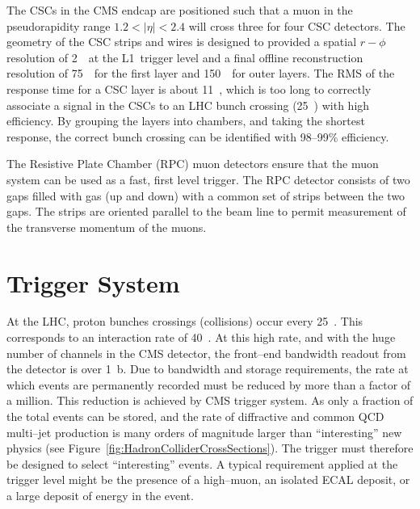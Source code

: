 The CSCs in the CMS endcap are positioned such that a muon in the pseudorapidity
range $1.2 < |\eta| < 2.4$ will cross three for four CSC detectors.  The
geometry of the CSC strips and wires is designed to provided a spatial $r-\phi$
resolution of 2~\milli\meter~at the L1~trigger level and a final offline
reconstruction resolution of 75~\micro\meter~for the first layer and
150~\micro\meter~for outer layers.  The RMS of the response time for a CSC layer
is about 11~\nano\second, which is too long to correctly associate a signal in
the CSCs to an LHC bunch crossing (25~\nano\second) with high efficiency.  By
grouping the layers into chambers, and taking the shortest response, the correct
bunch crossing can be identified with \mbox{98--99\%} efficiency.

The Resistive Plate Chamber (RPC) muon detectors ensure that the muon system can
be used as a fast, first level trigger.  The RPC detector consists of two gaps
filled with gas (up and down) with a common set of strips between the two gaps.
The strips are oriented parallel to the beam line to permit measurement of the
transverse momentum of the muons.

\section{Trigger System}
\label{sec:Trigger}

At the LHC, proton bunches crossings (collisions) occur every 25~\nano\second.
This corresponds to an interaction rate of 40~\mega\hertz.  At this high rate, and
with the huge number of channels in the CMS detector, the front--end bandwidth
readout from the detector is over 1~\peta b\per\second.  Due to bandwidth and
storage requirements, the rate at which events are permanently recorded must be
reduced by more than a factor of a million. This reduction is achieved by CMS
trigger system.  As only a fraction of the total events can be stored, and the
rate of diffractive and common QCD multi--jet production is many orders of
magnitude larger than ``interesting'' new physics (see
Figure~\ref{fig:HadronColliderCrossSections}).  The trigger must therefore be
designed to select ``interesting'' events.  A typical requirement applied at the
trigger level might be the presence of a high--\pt muon, an isolated ECAL
deposit, or a large deposit of energy in the event.

